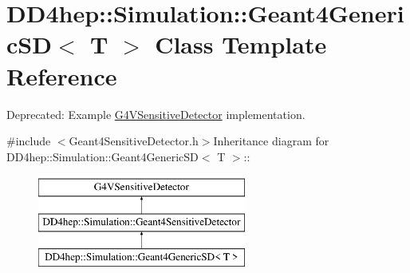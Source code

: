 \hypertarget{class_d_d4hep_1_1_simulation_1_1_geant4_generic_s_d}{
\section{DD4hep::Simulation::Geant4GenericSD$<$ T $>$ Class Template Reference}
\label{class_d_d4hep_1_1_simulation_1_1_geant4_generic_s_d}
}


Deprecated: Example \hyperlink{class_g4_v_sensitive_detector}{G4VSensitiveDetector} implementation.  


{\ttfamily \#include $<$Geant4SensitiveDetector.h$>$}Inheritance diagram for DD4hep::Simulation::Geant4GenericSD$<$ T $>$::\begin{figure}[H]
\begin{center}
\leavevmode
\includegraphics[height=3cm]{class_d_d4hep_1_1_simulation_1_1_geant4_generic_s_d}
\end{center}
\end{figure}
